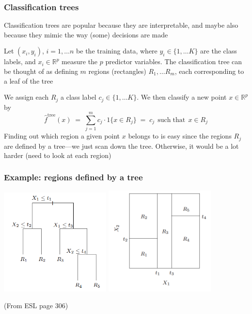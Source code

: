 \documentclass[mathserif]{beamer}
\def\R{\mathds{R}}
\def\red{\color[rgb]{0.8,0,0}}
\begin{document}
\begin{frame}
\frametitle{Classification trees}
\smallskip
{\red Classification trees} are popular because they are 
interpretable, and maybe also because they mimic the way (some) decisions 
are made

\bigskip
Let $(x_i,y_i)$, $i=1,\ldots n$ be the training data, where 
$y_i \in \{1,\ldots K\}$ are the class labels, and 
$x_i \in \R^p$
measure the $p$ predictor variables. The classification tree can
be thought of as defining $m$ regions (rectangles) $R_1,\ldots R_m$, each 
corresponding to a leaf of the tree

\bigskip
We assign each $R_j$ a class label $c_j \in \{1,\ldots K\}$. We then 
classify a new point $x \in \R^p$ by
$$\hat{f}^\mathrm{tree}(x) \;=\; \sum_{j=1}^m c_j \cdot 1\{x \in R_j\}
\;=\; c_j \;\, \mathrm{such}\;\mathrm{that}\;\, x \in R_j$$
Finding out which region a given point $x$ belongs to is {\red easy} since
the regions $R_j$ are defined by a tree---we just scan down the tree.
Otherwise, it would be a lot harder (need to look at each region)
\end{frame}

\begin{frame}
\frametitle{Example: regions defined by a tree}
\bigskip
\includegraphics[width=2.2in]{ex1-tree.png}
\includegraphics[width=2.2in]{ex1-regions.png}

\bigskip
(From ESL page 306)
\end{frame}
\end{document}

